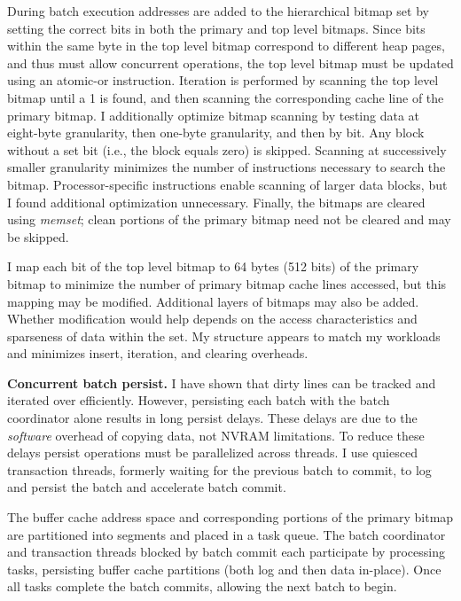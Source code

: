 During batch execution addresses are added to the hierarchical bitmap set by setting the correct bits in both the primary and top level bitmaps.
Since bits within the same byte in the top level bitmap correspond to different heap pages, and thus must allow concurrent operations, the top level bitmap must be updated using an atomic-or instruction.
Iteration is performed by scanning the top level bitmap until a 1 is found, and then scanning the corresponding cache line of the primary bitmap.
I additionally optimize bitmap scanning by testing data at eight-byte granularity, then one-byte granularity, and then by bit.
Any block without a set bit (i.e., the block equals zero) is skipped.
Scanning at successively smaller granularity minimizes the number of instructions necessary to search the bitmap.
Processor-specific instructions enable scanning of larger data blocks, but I found additional optimization unnecessary.
Finally, the bitmaps are cleared using \emph{memset}; clean portions of the primary bitmap need not be cleared and may be skipped.

I map each bit of the top level bitmap to 64 bytes (512 bits) of the primary bitmap to minimize the number of primary bitmap cache lines accessed, but this mapping may be modified.
Additional layers of bitmaps may also be added.
Whether modification would help depends on the access characteristics and sparseness of data within the set.
My structure appears to match my workloads and minimizes insert, iteration, and clearing overheads.

\textbf{Concurrent batch persist.}
I have shown that dirty lines can be tracked and iterated over efficiently.
However, persisting each batch with the batch coordinator alone results in long persist delays.
These delays are due to the \emph{software} overhead of copying data, not NVRAM limitations.
To reduce these delays persist operations must be parallelized across threads.
I use quiesced transaction threads, formerly waiting for the previous batch to commit, to log and persist the batch and accelerate batch commit.

The buffer cache address space and corresponding portions of the primary bitmap are partitioned into segments and placed in a task queue.
The batch coordinator and transaction threads blocked by batch commit each participate by processing tasks, persisting buffer cache partitions (both log and then data in-place).
Once all tasks complete the batch commits, allowing the next batch to begin.

